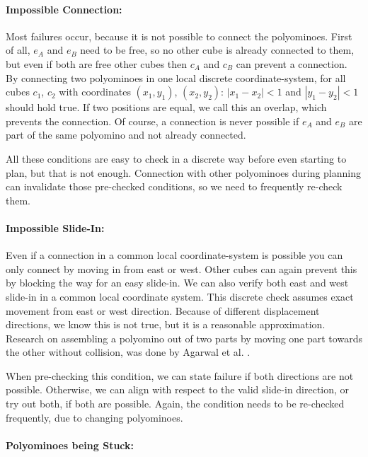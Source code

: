 \paragraph{Impossible Connection:}

Most failures occur, because it is not possible to connect the polyominoes.
First of all, $e_A$ and $e_B$ need to be free, so no other cube is already connected to them, but even if both are free other cubes then $c_A$ and $c_B$ can prevent a connection.
By connecting two polyominoes in one local discrete coordinate-system, for all cubes $c_1$, $c_2$ with coordinates $(x_1, y_1)$, $(x_2, y_2)$: $\left|x_1 - x_2\right| < 1$ and $\left|y_1 - y_2\right| < 1$ should hold true.
If two positions are equal, we call this an overlap, which prevents the connection.
Of course, a connection is never possible if $e_A$ and $e_B$ are part of the same polyomino and not already connected.

All these conditions are easy to check in a discrete way before even starting to plan, but that is not enough.
Connection with other polyominoes during planning can invalidate those pre-checked conditions, so we need to frequently re-check them.

\paragraph{Impossible Slide-In:}

Even if a connection in a common local coordinate-system is possible you can only connect by moving in from east or west.
Other cubes can again prevent this by blocking the way for an easy slide-in.
We can also verify both east and west slide-in in a common local coordinate system.
This discrete check assumes exact movement from east or west direction.
Because of different displacement directions, we know this is not true, but it is a reasonable approximation.
Research on assembling a polyomino out of two parts by moving one part towards the other without collision, was done by Agarwal et al. \cite{agarwal2021}. 

When pre-checking this condition, we can state failure if both directions are not possible.
Otherwise, we can align with respect to the valid slide-in direction, or try out both, if both are possible.
Again, the condition needs to be re-checked frequently, due to changing polyominoes.

\paragraph{Polyominoes being Stuck:}

